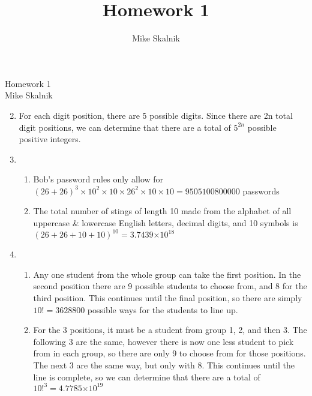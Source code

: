 \documentclass[12pt]{article}
\title{Homework 1}
\author{Mike Skalnik}
\providecommand{\e}[1]{\ensuremath{\times 10^{#1}}}
\newcommand{\s}[1]{\setcounter{enumi}{#1}}
\begin{document}
\begin{flushright}{\large Homework 1\\ Mike Skalnik}\end{flushright}

\begin{enumerate}
  \s{1}
  
  \item
    For each digit position, there are 5 possible digits. Since there are 2n total digit positions, we can determine that there are a total of $5^{2n}$ possible positive integers.
  \item
    \begin{enumerate}
      \item Bob's password rules only allow for
        $\left( 26 + 26 \right)^3 \times 10^2 \times 10 \times 26^2 \times 10 \times 10 = 9505100800000$
        passwords
      \item The total number of stings of length 10 made from the alphabet of all uppercase \& lowercase English letters, decimal digits, and 10 symbols is
        $\left( 26 + 26 + 10 + 10 \right)^{10} = 3.7439\e{18}$
    \end{enumerate}
 
  \s{5}
  
  \item
    \begin{enumerate}
      \item Any one student from the whole group can take the first position. In the second position there are 9 possible students to choose from, and 8 for the third position. This continues until the final position, so there are simply $10! = 3628800$ possible ways for the students to line up.
      \item For the 3 positions, it must be a student from group 1, 2, and then 3. The following 3 are the same, however there is now one less student to pick from in each group, so there are only 9 to choose from for those positions. The next 3 are the same way, but only with 8. This continues until the line is complete, so we can determine that there are a total of $10!^3 = 4.7785\e{19}$ 
    \end{enumerate}
  
  \s{10}


\end{enumerate}
\end{document}
